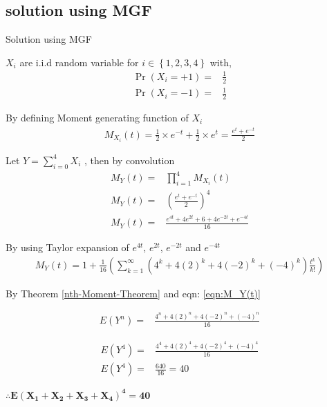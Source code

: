 \documentclass{beamer}
\providecommand{\mbf}{\mathbf}
\providecommand{\pr}[1]{\ensuremath{\Pr\left(#1\right)}}
\providecommand{\brak}[1]{\ensuremath{\left(#1\right)}}
\providecommand{\cbrak}[1]{\ensuremath{\left\{#1\right\}}}
\begin{document}
\subsection{solution using MGF}
\begin{frame}{Solution using MGF}
\begin{block}{}
$X_i$ are i.i.d random variable for $i \in \cbrak{1,2,3,4} $ 
with,
\begin{align}
    \pr{X_i=+1}=&\frac{1}{2}
    \\\pr{X_i=-1}=&\frac{1}{2}
\end{align}
\end{block}
\begin{block}{}
By defining Moment generating function of $X_i$
\begin{align}
    M_{X_i}\brak{t}=\frac{1}{2}\times e^{-t} + \frac{1}{2} \times e^{t}=\frac{e^{t}+e^{-t}}{2}
\end{align}
\end{block}
\end{frame}

\begin{frame}{}
\begin{block}{}
Let $Y=\sum_{i=0}^{4}X_i$ , then by convolution
\begin{align}
    M_{Y}\brak{t}=& \prod_{i=1}^{4} M_{X_i}\brak{t} 
    \\M_{Y}\brak{t} =& \brak{\frac{e^{t}+e^{-t}}{2}}^4
    \\M_{Y}\brak{t} =& \frac{e^{4t}+4e^{2t}+6+4e^{-2t}+e^{-4t}}{16}
\end{align}
\end{block}
\begin{block}{}
By using Taylor expansion of $e^{4t}$, $e^{2t}$, $e^{-2t}$ and $e^{-4t}$
\begin{align}
    M_Y(t)=1+ \frac{1}{16}\brak{ \sum_{k=1}^{\infty} \brak{4^k+4(2)^k+4(-2)^k+(-4)^k}\frac{t^k}{k!} }
    \label{eqn:M_Y(t)}
\end{align}
\end{block}
\end{frame}

\begin{frame}{}
By Theorem \ref{nth-Moment-Theorem} and eqn: \eqref{eqn:M_Y(t)}
\begin{block}{}
\begin{align}
    E\brak{Y^n}=&\frac{4^n+4(2)^n+4(-2)^n+(-4)^n}{16} 
\end{align}

\begin{align}
    E\brak{Y^4}=&\frac{4^4+4(2)^4+4(-2)^4+(-4)^4}{16} 
    \\E\brak{Y^4}=&\frac{640}{16}=40
\end{align}

{\centering
$\mbf{\therefore E\brak{X_1+X_2 +X_3 +X_4}^4=40}$

}
\end{block}
\end{frame}
\end{document}
